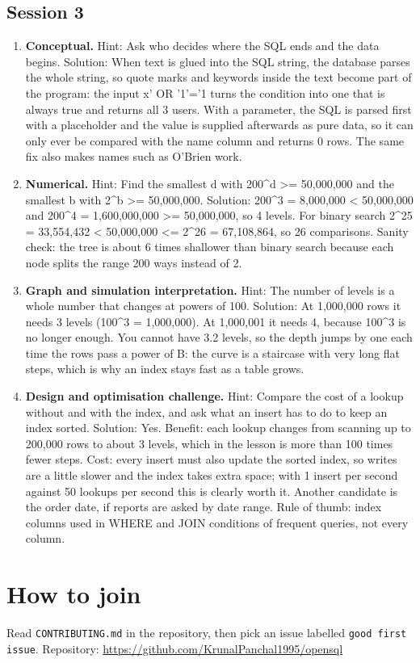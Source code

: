 \documentclass[11pt,a4paper]{article}
\begin{document}
\subsection*{Session 3}
\begin{enumerate}[nosep]
\item \textbf{Conceptual.} Hint: Ask who decides where the SQL ends and the data begins. Solution: When text is glued into the SQL string, the database parses the whole string, so quote marks and keywords inside the text become part of the program: the input x' OR '1'='1 turns the condition into one that is always true and returns all 3 users. With a parameter, the SQL is parsed first with a placeholder and the value is supplied afterwards as pure data, so it can only ever be compared with the name column and returns 0 rows. The same fix also makes names such as O'Brien work.
\item \textbf{Numerical.} Hint: Find the smallest d with 200\textasciicircum{}d \textgreater{}= 50,000,000 and the smallest b with 2\textasciicircum{}b \textgreater{}= 50,000,000. Solution: 200\textasciicircum{}3 = 8,000,000 \textless{} 50,000,000 and 200\textasciicircum{}4 = 1,600,000,000 \textgreater{}= 50,000,000, so 4 levels. For binary search 2\textasciicircum{}25 = 33,554,432 \textless{} 50,000,000 \textless{}= 2\textasciicircum{}26 = 67,108,864, so 26 comparisons. Sanity check: the tree is about 6 times shallower than binary search because each node splits the range 200 ways instead of 2.
\item \textbf{Graph and simulation interpretation.} Hint: The number of levels is a whole number that changes at powers of 100. Solution: At 1,000,000 rows it needs 3 levels (100\textasciicircum{}3 = 1,000,000). At 1,000,001 it needs 4, because 100\textasciicircum{}3 is no longer enough. You cannot have 3.2 levels, so the depth jumps by one each time the rows pass a power of B: the curve is a staircase with very long flat steps, which is why an index stays fast as a table grows.
\item \textbf{Design and optimisation challenge.} Hint: Compare the cost of a lookup without and with the index, and ask what an insert has to do to keep an index sorted. Solution: Yes. Benefit: each lookup changes from scanning up to 200,000 rows to about 3 levels, which in the lesson is more than 100 times fewer steps. Cost: every insert must also update the sorted index, so writes are a little slower and the index takes extra space; with 1 insert per second against 50 lookups per second this is clearly worth it. Another candidate is the order date, if reports are asked by date range. Rule of thumb: index columns used in WHERE and JOIN conditions of frequent queries, not every column.
\end{enumerate}

\section{How to join}
Read \texttt{CONTRIBUTING.md} in the repository, then pick an issue labelled \texttt{good first issue}. Repository: \url{https://github.com/KrunalPanchal1995/opensql}
\end{document}
